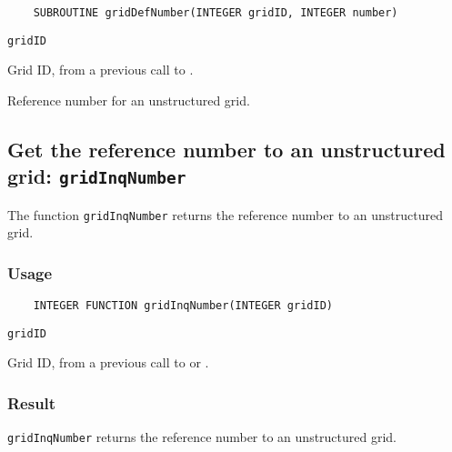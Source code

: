 \begin{verbatim}
    SUBROUTINE gridDefNumber(INTEGER gridID, INTEGER number)
\end{verbatim}

\hspace*{4mm}\begin{minipage}[]{15cm}
\begin{deflist}{\tt gridID\ }
\item[{\tt gridID}]
Grid ID, from a previous call to {}.
\item[{\tt number}]
Reference number for an unstructured grid.

\end{deflist}
\end{minipage}


\subsection{Get the reference number to an unstructured grid: {\tt gridInqNumber}}
\label{gridInqNumber}

The function {\tt gridInqNumber} returns the reference number to an unstructured grid.

\subsubsection*{Usage}

\begin{verbatim}
    INTEGER FUNCTION gridInqNumber(INTEGER gridID)
\end{verbatim}

\hspace*{4mm}\begin{minipage}[]{15cm}
\begin{deflist}{\tt gridID\ }
\item[{\tt gridID}]
Grid ID, from a previous call to {} or {}.

\end{deflist}
\end{minipage}

\subsubsection*{Result}

{\tt gridInqNumber} returns the reference number to an unstructured grid.



